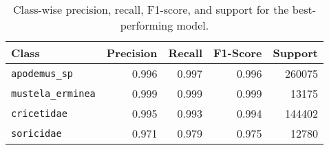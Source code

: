 \begin{table}[ht]
\centering
\caption{Class-wise precision, recall, F1-score, and support for the best-performing model.}
\label{tab:precision_recall_fscore_support}
\begin{tabular}{l r r r r}
\toprule
Class & Precision & Recall & F1-Score & Support \\
\midrule
\texttt{apodemus\_sp} & 0.996 & 0.997 & 0.996 & 260075 \\
\texttt{mustela\_erminea} & 0.999 & 0.999 & 0.999 & 13175 \\
\texttt{cricetidae} & 0.995 & 0.993 & 0.994 & 144402 \\
\texttt{soricidae} & 0.971 & 0.979 & 0.975 & 12780 \\
\bottomrule
\end{tabular}
\end{table}